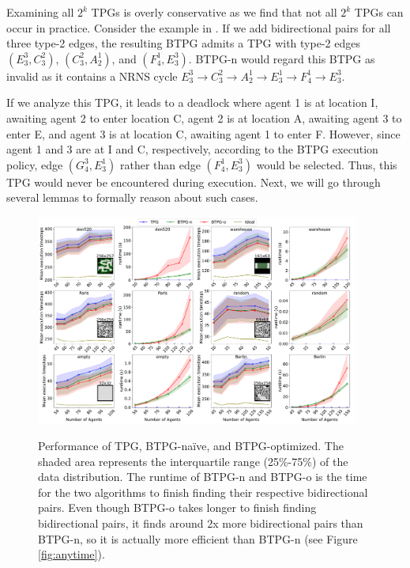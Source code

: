 \documentclass[letterpaper]{article} %
\theoremstyle{definition}
\newtheorem{definition}{Definition}
\newcommand{\rishi}[1]{\textcolor{black}{\textbf{Rishi:}} 
\textcolor{purple}{#1}}
\begin{document}


Examining all $2^k$ TPGs is overly conservative as we find that not all $2^k$ TPGs can occur in practice. Consider the example in . If we add bidirectional pairs for all three type-2 edges, the resulting BTPG admits a TPG with type-2 edges $(E^3_3,C_3^2)$, $(C_3^2,A_2^1)$, and $(F^1_4,E^3_3)$. BTPG-n would regard this BTPG as invalid as it contains a NRNS cycle $E^3_3 \rightarrow C^2_3 \rightarrow A^1_2  \rightarrow E^1_3 \rightarrow F^1_4 \rightarrow E^3_3$.

If we analyze this TPG, it leads to a deadlock where agent 1 is at location I, awaiting agent 2 to enter location C, agent 2 is at location A, awaiting agent 3 to enter E, and agent 3 is at location C, awaiting agent 1 to enter F. However, since agent 1 and 3 are at I and C, respectively, according to the BTPG execution policy, edge $(G_4^3,E_3^1)$ rather than edge $(F_4^1,E_3^3)$ would be selected. 
Thus, this TPG would never be encountered during execution. Next, we will go through several lemmas to formally reason about such cases.

\begin{figure}[th!]
     \centering
     \includegraphics[width=0.95\textwidth]{Figs/results.pdf}
     \label{random}
    \caption{Performance of TPG, BTPG-naïve, and BTPG-optimized. The shaded area represents the interquartile range (25\%-75\%) of the data distribution. The runtime of BTPG-n and BTPG-o is the time for the two algorithms to finish finding their respective bidirectional pairs. Even though BTPG-o takes longer to finish finding bidirectional pairs, it finds around 2x more bidirectional pairs than BTPG-n, so it is actually more efficient than BTPG-n (see Figure \ref{fig:anytime}). }
    \label{fig:comparison}
\end{figure}
\end{document}
